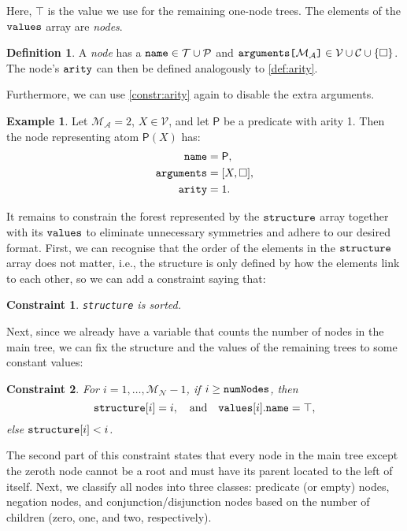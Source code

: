 \documentclass[letterpaper]{article}
\newtheorem{constraint}{Constraint}
\theoremstyle{definition}
\newtheorem{definition}{Definition}
\newtheorem{example}{Example}
\newcommand{\variable}[1]{\texttt{\textup{#1}}}
\newcommand{\arrayd}[3]{\variable{{#1}[}{#2}\variable{]} \in {#3}}
\newcommand{\predicates}{\mathcal{P}}
\newcommand{\variables}{\mathcal{V}}
\newcommand{\constants}{\mathcal{C}}
\newcommand{\tokens}{\mathcal{T}}
\newcommand{\maxArity}{\mathcal{M}_{\mathcal{A}}}
\newcommand{\maxNumNodes}{\mathcal{M}_{\mathcal{N}}}
\begin{document}
Here, $\top$ is the value we use for the remaining one-node trees. The
elements of the $\variable{values}$ array are \emph{nodes}.

\begin{definition} \label{def:node}
  A \emph{node} has a $\variable{name} \in \tokens{} \cup \predicates{}$ and
  $\arrayd{arguments}{\maxArity{}}{\variables{} \cup \constants{} \cup \{ \Box
    \}}$. The node's $\variable{arity}$ can then be
  defined analogously to \cref{def:arity}.
\end{definition}

Furthermore, we can use \cref{constr:arity} again to disable the extra
arguments.

\begin{example}
  Let $\maxArity{} = 2$, $X \in \variables{}$, and let $\mathsf{P}$ be a
  predicate with arity 1. Then the node representing atom $\mathsf{P}(X)$ has:
  \begin{align*}
    \variable{name} &= \mathsf{P},\\
    \variable{arguments} &= [X, \Box],\\
    \variable{arity} &= 1.
  \end{align*}
\end{example}

It remains to constrain the forest represented by the $\variable{structure}$
array together with its $\variable{values}$ to eliminate unnecessary symmetries
and adhere to our desired format. First, we can recognise that the order of the
elements in the $\variable{structure}$ array does not matter, i.e., the
structure is only defined by how the elements link to each other, so we can add
a constraint saying that:

\begin{constraint}
  \variable{structure} is sorted.
\end{constraint}

Next, since we already have a variable that counts the number of nodes in the
main tree, we can fix the structure and the values of the remaining trees to
some constant values:

\begin{constraint}
  For $i = 1, \dots, \maxNumNodes{} - 1$, if $i \ge \variable{numNodes}$, then
  \[
    \variable{structure}[i] = i, \quad \text{and} \quad
    \variable{values}[i].\variable{name} = \top,
  \]
  else $\variable{structure}[i] < i$.
\end{constraint}

The second part of this constraint states that every node in the main tree
except the zeroth node cannot be a root and must have its parent located to
the left of itself. Next, we classify all nodes into three classes: predicate
(or empty) nodes, negation nodes, and conjunction/disjunction nodes based on the
number of children (zero, one, and two, respectively).
\end{document}

